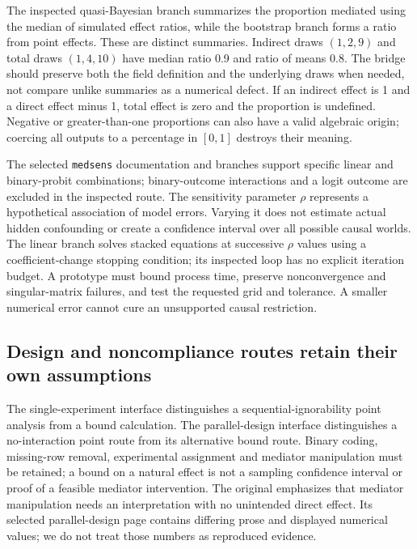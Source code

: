 The inspected quasi-Bayesian branch summarizes the proportion mediated using
the median of simulated effect ratios, while the bootstrap branch forms a
ratio from point effects. These are distinct summaries. Indirect draws
$(1,2,9)$ and total draws $(1,4,10)$ have median ratio 0.9 and ratio of means
0.8. The bridge should preserve both the field definition and the underlying
draws when needed, not compare unlike summaries as a numerical defect. If an
indirect effect is 1 and a direct effect minus 1, total effect is zero and the
proportion is undefined. Negative or greater-than-one proportions can also
have a valid algebraic origin; coercing all outputs to a percentage in
$[0,1]$ destroys their meaning.
\citep{exec24_mediation_sources,exec24_mediation_contract,exec20_med_reference}

The selected \texttt{medsens} documentation and branches support specific
linear and binary-probit combinations; binary-outcome interactions and a
logit outcome are excluded in the inspected route. The sensitivity parameter
$\rho$ represents a hypothetical association of model errors. Varying it does
not estimate actual hidden confounding or create a confidence interval over
all possible causal worlds. The linear branch solves stacked equations at
successive $\rho$ values using a coefficient-change stopping condition; its
inspected loop has no explicit iteration budget. A prototype must bound
process time, preserve nonconvergence and singular-matrix failures, and test
the requested grid and tolerance. A smaller numerical error cannot cure an
unsupported causal restriction.
\citep{exec24_mediation_sources,exec24_mediation_original,exec20_med_reference}

\subsection{Design and noncompliance routes retain their own assumptions}
The single-experiment interface distinguishes a sequential-ignorability point
analysis from a bound calculation. The parallel-design interface distinguishes
a no-interaction point route from its alternative bound route. Binary coding,
missing-row removal, experimental assignment and mediator manipulation must be
retained; a bound on a natural effect is not a sampling confidence interval
or proof of a feasible mediator intervention. The original emphasizes that
mediator manipulation needs an interpretation with no unintended direct effect.
Its selected parallel-design page contains differing prose and displayed
numerical values; we do not treat those numbers as reproduced evidence.
\citep{exec24_mediation_sources,exec24_mediation_original}

